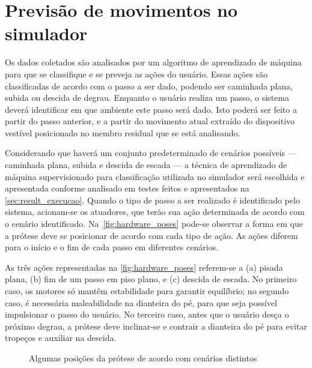 \section{Previsão de movimentos no simulador}\label{sec:metodo_previsao}

Os dados coletados são analisados por um algoritmo de aprendizado de máquina para que se classifique e se preveja as ações do usuário. Essas ações são classificadas de acordo com o passo a ser dado, podendo ser caminhada plana, subida ou descida de degrau. Enquanto o usuário realiza um passo, o sistema deverá identificar em que ambiente este passo será dado. Isto poderá ser feito a partir do passo anterior, e a partir do movimento atual extraído do dispositivo vestível posicionado no membro residual que se está analisando.

Considerando que haverá um conjunto predeterminado de cenários possíveis --- caminhada plana, subida e descida de escada --- a técnica de aprendizado de máquina supervisionado para classificação utilizada no simulador será escolhida e apresentada conforme analisado em testes feitos e apresentados na \autoref{sec:result_execucao}. Quando o tipo de passo a ser realizado é identificado pelo sistema, acionam-se os atuadores, que terão sua ação determinada de acordo com o cenário identificado. Na~\autoref{fig:hardware_poses} pode-se observar a forma em que a prótese deve se posicionar de acordo com cada tipo de ação. As ações diferem para o início e o fim de cada passo em diferentes cenários.

As três ações representadas na \autoref{fig:hardware_poses} referem-se a (a) pisada plana, (b) fim de um passo em piso plano, e (c) descida de escada. No primeiro caso, os motores só mantêm estabilidade para garantir equilíbrio; no segundo caso, é necessária maleabilidade na dianteira do pé, para que seja possível impulsionar o passo do usuário. No terceiro caso, antes que o usuário desça o próximo degrau, a prótese deve inclinar-se e contrair a dianteira do pé para evitar tropeços e auxiliar na descida.

\begin{figure}[h]
	\caption{\label{fig:hardware_poses}Algumas posições da prótese de acordo com cenários distintos}
	\begin{center}
	\end{center}
\end{figure}


